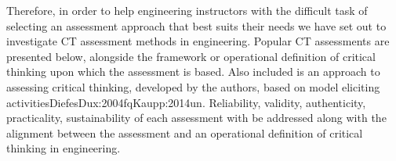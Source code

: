 Therefore, in order to help engineering instructors with the difficult task of selecting an assessment approach that best suits their needs we have set out to investigate CT assessment methods in engineering.   Popular CT assessments are presented below, alongside the framework or operational definition of critical thinking upon which the assessment is based.  Also included is an approach to assessing critical thinking, developed by the authors, based on model eliciting activities{DiefesDux:2004fq}{Kaupp:2014un}. Reliability, validity, authenticity, practicality, sustainability of each assessment with be addressed along with the alignment between the assessment and an operational definition of critical thinking in engineering.

